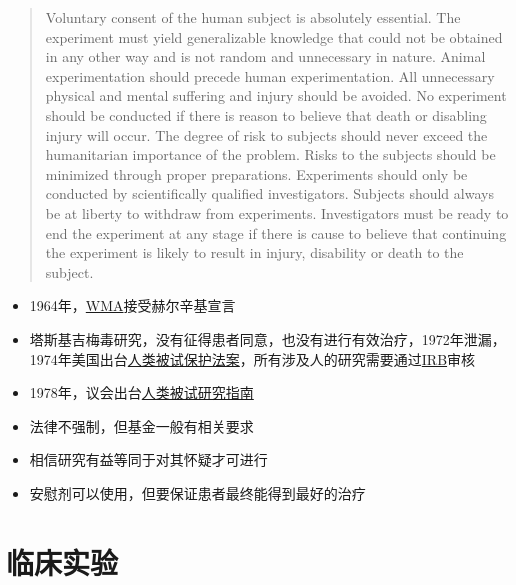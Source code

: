 \documentclass[
]{book}
\providecommand{\tightlist}{%
  \setlength{\itemsep}{0pt}\setlength{\parskip}{0pt}}
\begin{document}
\begin{quote}
Voluntary consent of the human subject is absolutely essential.
The experiment must yield generalizable knowledge that could not be obtained in any other way and is not random and unnecessary in nature.
Animal experimentation should precede human experimentation.
All unnecessary physical and mental suffering and injury should be avoided.
No experiment should be conducted if there is reason to believe that death or disabling injury will occur.
The degree of risk to subjects should never exceed the humanitarian importance of the problem.
Risks to the subjects should be minimized through proper preparations.
Experiments should only be conducted by scientifically qualified investigators.
Subjects should always be at liberty to withdraw from experiments.
Investigators must be ready to end the experiment at any stage if there is cause to believe that continuing the experiment is likely to result in injury, disability or death to the subject.
\end{quote}

\begin{itemize}
\tightlist
\item
  1964年，\href{http://www.wma.net/en/60about/70history/01declarationHelsinki/index.html}{WMA}接受赫尔辛基宣言
\item
  塔斯基吉梅毒研究，没有征得患者同意，也没有进行有效治疗，1972年泄漏，1974年美国出台\href{http://www.hhs.gov/ohrp/humansubjects/guidance/45cfr46.html}{人类被试保护法案}，所有涉及人的研究需要通过\href{http://www.hhs.gov/ohrp/humansubjects/guidance/45cfr46.html\#46.107}{IRB}审核
\item
  1978年，议会出台\href{http://www.hhs.gov/ohrp/policy/belmont.html}{人类被试研究指南}
\item
  法律不强制，但基金一般有相关要求
\item
  相信研究有益等同于对其怀疑才可进行
\item
  安慰剂可以使用，但要保证患者最终能得到最好的治疗
\end{itemize}

\hypertarget{ux4e34ux5e8aux5b9eux9a8c}{%
\section{临床实验}\label{ux4e34ux5e8aux5b9eux9a8c}}
\end{document}
